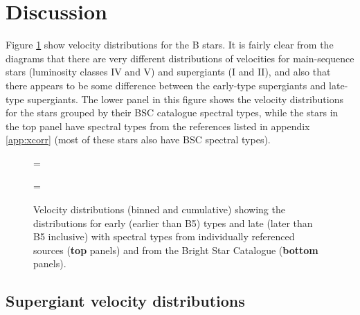 \section{Discussion}

Figure \ref{fig:veldist} show velocity distributions for the B
stars. It is fairly clear from the diagrams that there are very
different distributions of velocities for main-sequence stars
(luminosity classes IV and V) and supergiants (I and II), and also
that there appears to be some difference between the early-type
supergiants and late-type supergiants. The lower panel in this figure
shows the velocity distributions for the stars grouped by their BSC
catalogue spectral types, while the stars in the top panel have
spectral types from the references listed in appendix
\ref{app:xcorr} (most of these stars also have BSC spectral
types).

\begin{figure} %
\epsfxsize=\figwidth
\setlength{\cen}{(\textwidth / 2) - (\epsfxsize / 2)}
\hspace{\cen}

\epsfxsize=\figwidth
\setlength{\cen}{(\textwidth / 2) - (\epsfxsize / 2)}
\hspace{\cen}

\caption[Velocity distributions]
{\fcfont Velocity distributions (binned and cumulative) showing the
distributions for early (earlier than B5) types and late (later than
B5 inclusive) with spectral types from individually referenced sources
(\textbf{top} panels) and from the Bright Star Catalogue
(\textbf{bottom} panels).}
\label{fig:veldist}
\end{figure}   %


\subsection{Supergiant velocity distributions}

